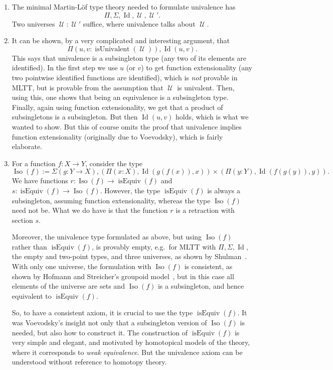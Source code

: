 \documentclass{article}
\newcommand{\Id}{\operatorname{Id}}
\newcommand{\U}{\operatorname{\mathcal{U}}}
\newcommand{\isEquiv}{\operatorname{isEquiv}}
\newcommand{\isUnivalent}{\operatorname{isUnivalent}}
\newcommand{\Iso}{\operatorname{Iso}}
\begin{document}
\begin{enumerate}
\item 
 The minimal Martin-L\"of type theory needed to formulate univalence
    has
    \[
      \Pi, \Sigma, \Id, \U, \U'.
    \]
    Two universes $\U :\U'$ suffice, where univalence talks about $\U$.
  
\item It can be shown, by a very complicated and interesting argument,
    that
    \[
     \Pi(u,v: \isUnivalent(\U)), \Id(u,v).
   \]
    This says that univalence is a subsingleton type (any two of its
    elements are identified). In the first step we use $u$ (or $v$) to get
    function extensionality (any two pointwise identified functions
    are identified), which is \emph{not} provable in MLTT, but is provable
    from the assumption that $\U$ is univalent. Then, using this, one
    shows that being an equivalence is a subsingleton type. Finally,
    again using function extensionality, we get that a product of
    subsingletons is a subsingleton. But then $\Id(u,v)$ holds, which is
    what we wanted to show. But this of course omits the proof that
    univalence implies function extensionality (originally due to
    Voevodsky), which is fairly elaborate.

 \item For a function $f:X\to Y$, consider the type
   \[
     \Iso(f) := \Sigma(g:Y\to X), (\Pi(x:X), \Id(g(f(x)),x)) \times  (\Pi(y:Y), \Id(f(g(y)),y)).
   \]
    We have functions $r:\Iso(f)\to \isEquiv(f)$ and
    $s:\isEquiv(f)\to \Iso(f)$. However, the type $\isEquiv(f)$ is always a
    subsingleton, assuming function extensionality, whereas the type
    $\Iso(f)$ need not be. What we do have is that the function $r$ is a
    retraction with section $s$.

    Moreover, the univalence type formulated as above, but using
    $\Iso(f)$ rather than $\isEquiv(f)$, is provably empty, e.g.\ for
    MLTT with $\Pi, \Sigma, \Id$, the empty and two-point types, and
    three universes, as shown by Shulman~\cite{shulman:e46}. With only
    one universe, the formulation with $\Iso(f)$ is consistent, as
    shown by Hofmann and Streicher's groupoid model~\cite{MR1686862},
    but in this case all elements of the universe are sets and
    $\Iso(f)$ is a subsingleton, and hence equivalent to
    $\isEquiv(f)$.
    
    So, to have a consistent axiom, it is crucial to use the type
    $\isEquiv(f)$. It was Voevodsky's insight not only that a
    subsingleton version of $\Iso(f)$ is needed, but also how to
    construct it. The construction of $\isEquiv(f)$ is very simple and
    elegant, and motivated by homotopical models of the theory, where
    it corresponds to \emph{weak equivalence}. But the univalence
    axiom can be understood without reference to homotopy theory.


\end{enumerate}
\end{document}

